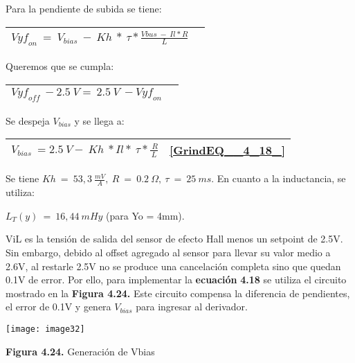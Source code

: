 \documentclass{article} %
\begin{document}
\noindent Para la pendiente de subida se tiene:

\noindent 

\begin{tabular}{|p{3.9in}|p{0.4in}|} \hline 
${Vyf}_{on}\ =\ V_{bias}\ -\ Kh\ *\ \tau *\frac{Vbus\ -\ Il*R}{L}$ &   \\ \hline 
\end{tabular}



\noindent Queremos que se cumpla:

\noindent 

\begin{tabular}{|p{3.9in}|p{0.4in}|} \hline 
${Vyf}_{off}\ -2.5\ V=\ 2.5\ V\ -{Vyf}_{on}$ &   \\ \hline 
\end{tabular}



\noindent Se despeja $V_{bias}$ y se llega a:

\noindent 

\begin{tabular}{|p{3.9in}|p{0.4in}|} \hline 
$V_{bias}\ =2.5\ V-\ Kh\ *Il*\ \tau *\frac{\ R}{L}$ & \eqref{GrindEQ__4_18_}  \\ \hline 
\end{tabular}



\noindent Se tiene $Kh\ =\ 53,3\ \frac{mV}{A},\ R\ =\ 0.2\ \mathit{\Omega},\ \tau \ =\ 25\ ms$. En cuanto a la inductancia, se utiliza:

\noindent 

\noindent $L_T(y)\ =\ 16,44\ mHy$ (para Yo = 4mm).

\noindent 

\noindent ViL es la tensi\'{o}n de salida del sensor de efecto Hall menos un setpoint de 2.5V. Sin embargo, debido al offset agregado al sensor para llevar su valor medio a 2.6V, al restarle 2.5V no se produce una cancelaci\'{o}n completa sino que quedan 0.1V de error. Por ello, para implementar la \textbf{ecuaci\'{o}n} \textbf{4.18} se utiliza el circuito mostrado en la \textbf{Figura 4.24.} Este circuito compensa la diferencia de pendientes, el error de 0.1V y genera $V_{bias}$ para ingresar al derivador. 

\noindent 

\noindent \texttt{[image: image32]}

\noindent \textbf{Figura 4.24. }Generaci\'{o}n de Vbias
\end{document}
